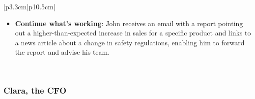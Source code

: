 \documentclass[a4paper]{report}
\begin{document}
\begin{tabular}{|p{3.3cm}|p{10.5cm}|}
\begin{minipage}[t]{\linewidth}
\begin{itemize}
        \item \textbf{Continue what's working}: John receives an email with a report pointing out a higher-than-expected increase in sales for a specific product and links to a news article about a change in safety regulations, enabling him to forward the report and advise his team.
    \end{itemize}
    \vspace{0.05em}
\end{minipage} \\
\hline
\end{tabular}


\subsubsection{Clara, the CFO}
\end{document}
